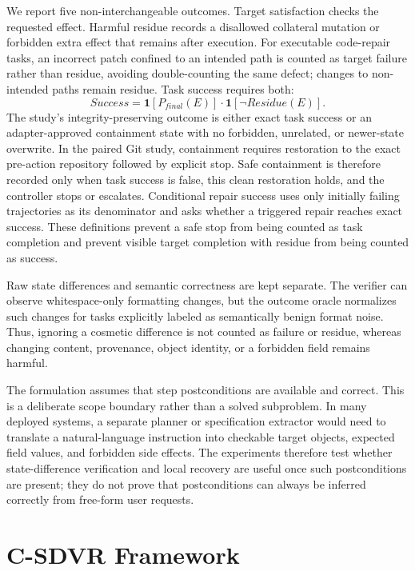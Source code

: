 \documentclass[pdflatex,sn-apa]{sn-jnl}
\begin{document}
We report five non-interchangeable outcomes. Target satisfaction checks the requested effect. Harmful residue records a disallowed collateral mutation or forbidden extra effect that remains after execution. For executable code-repair tasks, an incorrect patch confined to an intended path is counted as target failure rather than residue, avoiding double-counting the same defect; changes to non-intended paths remain residue. Task success requires both:
\begin{equation}
  Success = \mathbf{1}[P_{final}(E)] \cdot \mathbf{1}[\neg Residue(E)].
\end{equation}
The study's integrity-preserving outcome is either exact task success or an adapter-approved containment state with no forbidden, unrelated, or newer-state overwrite. In the paired Git study, containment requires restoration to the exact pre-action repository followed by explicit stop. Safe containment is therefore recorded only when task success is false, this clean restoration holds, and the controller stops or escalates. Conditional repair success uses only initially failing trajectories as its denominator and asks whether a triggered repair reaches exact success. These definitions prevent a safe stop from being counted as task completion and prevent visible target completion with residue from being counted as success.

Raw state differences and semantic correctness are kept separate. The verifier can observe whitespace-only formatting changes, but the outcome oracle normalizes such changes for tasks explicitly labeled as semantically benign format noise. Thus, ignoring a cosmetic difference is not counted as failure or residue, whereas changing content, provenance, object identity, or a forbidden field remains harmful.

The formulation assumes that step postconditions are available and correct. This is a deliberate scope boundary rather than a solved subproblem. In many deployed systems, a separate planner or specification extractor would need to translate a natural-language instruction into checkable target objects, expected field values, and forbidden side effects. The experiments therefore test whether state-difference verification and local recovery are useful once such postconditions are present; they do not prove that postconditions can always be inferred correctly from free-form user requests.

\section{C-SDVR Framework}
\end{document}
